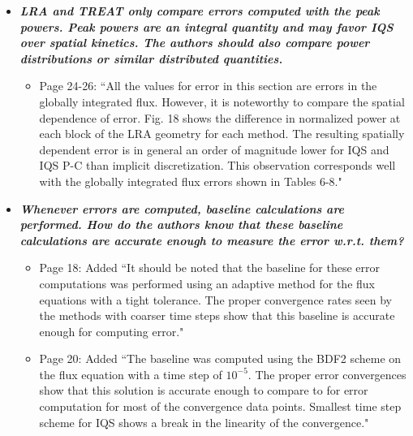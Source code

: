 \documentclass{elsarticle}
\newcommand{\done}{\checkmark}
\newcommand{\medm}[1]{\textbf{\textit{#1}}}
\newcommand{\hard}[1]{\textbf{\textit{#1}}}
\begin{document}
\begin{itemize}
\item[\done] \hard{ LRA and TREAT only compare errors computed with the peak powers. Peak powers are an integral quantity and may favor IQS over spatial kinetics. The authors should also compare power distributions or similar distributed quantities. }
\begin{itemize}
\item Page 24-26: ``All the values for error in this section are errors in the globally integrated flux. However, it is noteworthy to compare the spatial dependence of error. Fig. 18 shows the difference in normalized power at each block of the LRA geometry for each method. The resulting spatially dependent error is in general an order of magnitude lower for IQS and IQS P-C than implicit discretization. This observation corresponds well with the globally integrated flux errors shown in Tables 6-8."
\end{itemize}
%

\item[\done] \medm{  Whenever errors are computed, baseline calculations are performed. How do the authors know that these baseline calculations are accurate enough to measure the error w.r.t. them? }
\begin{itemize}
\item Page 18: Added ``It should be noted that the baseline for these error computations was performed using an adaptive method for the flux equations with a tight tolerance. The proper convergence rates seen by the methods with coarser time steps show that this baseline is accurate enough for computing error."
\item Page 20: Added ``The baseline was computed using the BDF2 scheme on the flux equation with a time step of $10^{-5}$. The proper error convergences show that this solution is accurate enough to compare to for error computation for most of the convergence data points. Smallest time step scheme for IQS shows a break in the linearity of the convergence."
\end{itemize}

\end{itemize}
\end{document}
